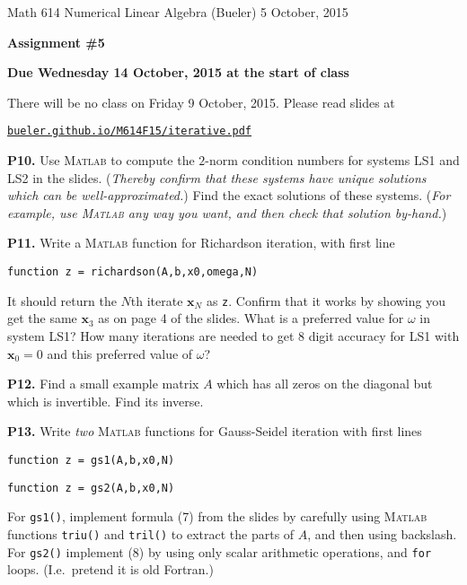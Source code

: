 \documentclass[12pt]{amsart}
\newcommand{\bx}{\mathbf{x}}
\newcommand{\prob}[1]{\bigskip\noindent\textbf{#1.}\quad }
\newcommand{\Matlab}{\textsc{Matlab}\xspace}
\begin{document}
\scriptsize \noindent Math 614 Numerical Linear Algebra (Bueler) \hfill 5 October, 2015
\normalsize

\bigskip

\Large\centerline{\textbf{Assignment \#5}}
\large
\medskip

\centerline{\textbf{Due Wednesday 14 October, 2015 at the start of class}}
\bigskip
\normalsize

\thispagestyle{empty}

\bigskip
There will be no class on Friday 9 October, 2015.  Please read slides at

\medskip
\centerline{\href{http://bueler.github.io/M614F15/iterative.pdf}{\texttt{bueler.github.io/M614F15/iterative.pdf}}}

\medskip

\prob{P10}  Use \Matlab to compute the $2$-norm condition numbers for systems LS1 and LS2 in the slides.  (\emph{Thereby confirm that these systems have unique solutions which can be well-approximated.})  Find the exact solutions of these systems.  (\emph{For example, use \Matlab any way you want, and then check that solution by-hand.})

\prob{P11}  Write a \Matlab function for Richardson iteration, with first line

\bigskip
\centerline{\texttt{function z = richardson(A,b,x0,omega,N)}}

\bigskip
\noindent It should return the $N$th iterate $\bx_N$ as \texttt{z}.  Confirm that it works by showing you get the same $\bx_3$ as on page 4 of the slides.  What is a preferred value for $\omega$ in system LS1?  How many iterations are needed to get 8 digit accuracy for LS1 with $\bx_0=0$ and this preferred value of $\omega$?

\prob{P12}  Find a small example matrix $A$ which has all zeros on the diagonal but which is invertible.  Find its inverse.

\prob{P13}  Write \emph{two} \Matlab functions for Gauss-Seidel iteration with first lines

\bigskip
\centerline{\texttt{function z = gs1(A,b,x0,N)}}

\centerline{\texttt{function z = gs2(A,b,x0,N)}}

\bigskip
\noindent For \texttt{gs1()}, implement formula (7) from the slides by carefully using \Matlab functions \texttt{triu()} and \texttt{tril()} to extract the parts of $A$, and then using backslash.  For \texttt{gs2()} implement (8) by using only scalar arithmetic operations, and \texttt{for} loops.  (I.e.~pretend it is old Fortran.)
\end{document}
